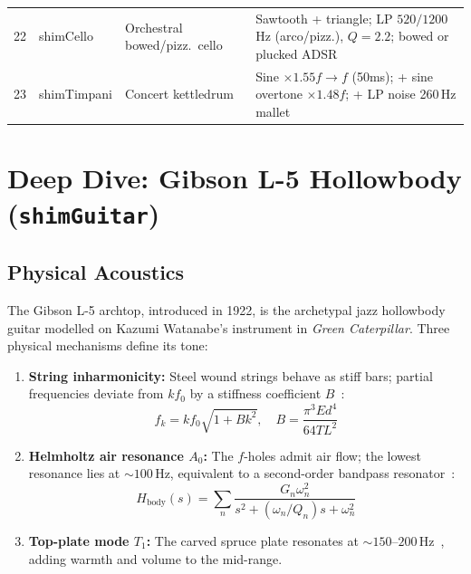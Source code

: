 \documentclass[10pt,journal,compsoc,twocolumn]{article}
\begin{document}
\begin{table}[t]
\begin{tabularx}{\textwidth}{@{}
  c
  >{\ttfamily\raggedright\arraybackslash}p{3.1cm}
  >{\raggedright\arraybackslash}p{3.4cm}
  >{\raggedright\arraybackslash}X
@{}}
22 & shimCello        & Orchestral bowed/pizz.\ cello     & Sawtooth + triangle; LP $520/1200$\,Hz (arco/pizz.), $Q=2.2$; bowed or plucked ADSR \\
23 & shimTimpani      & Concert kettledrum                & Sine $\times 1.55f\to f$ (50ms); + sine overtone $\times 1.48f$; + LP noise 260\,Hz mallet \\
\bottomrule
\end{tabularx}
\end{table}

\section{Deep Dive: Gibson L-5 Hollowbody (\texttt{shimGuitar})}
\label{sec:guitar}

\subsection{Physical Acoustics}

The Gibson L-5 archtop, introduced in 1922, is the archetypal jazz hollowbody
guitar modelled on Kazumi Watanabe's instrument in \emph{Green Caterpillar}.
Three physical mechanisms define its tone:

\begin{enumerate}[leftmargin=*]
    \item \textbf{String inharmonicity:} Steel wound strings behave as stiff
    bars; partial frequencies deviate from $kf_0$ by a stiffness coefficient
    $B$~\cite{fletcher1998physics}:
    \begin{equation}
    f_k = k f_0 \sqrt{1 + B k^2},\quad
    B = \frac{\pi^3 E d^4}{64 T L^2}
    \label{eq:string_stiffness}
    \end{equation}

    \item \textbf{Helmholtz air resonance $A_0$:} The $f$-holes admit air
    flow; the lowest resonance lies at $\sim 100$\,Hz, equivalent to a
    second-order bandpass resonator~\cite{Caldersmith1978guitar}:
    \begin{equation}
    H_{\mathrm{body}}(s) = \sum_n
    \frac{G_n\omega_n^2}{s^2 + (\omega_n/Q_n)s + \omega_n^2}
    \label{eq:body_res}
    \end{equation}

    \item \textbf{Top-plate mode $T_1$:} The carved spruce plate resonates at
    $\sim 150$--$200$\,Hz~\cite{Elejabarrieta2002guitar}, adding warmth and
    volume to the mid-range.
\end{enumerate}
\end{document}
